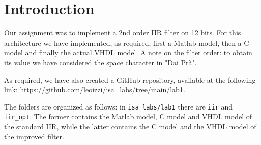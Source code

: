 \chapter{Introduction}

Our assignment was to implement a 2nd order IIR filter on 12 bits. For this architecture we have implemented, as required,
first a Matlab model, then a C model and finally the actual VHDL model.
A note on the filter order: to obtain its value we have considered the space character in "Dai Pr\`a".

As required, we have also created a GitHub repository, available at the following link: \url{https://github.com/leoizzi/isa_labs/tree/main/lab1}.

The folders are organized as follows: in \verb|isa_labs/lab1| there are \verb|iir| and \verb|iir_opt|. The former contains the Matlab model, C model
and VHDL model of the standard IIR, while the latter contains the C model and the VHDL model of the improved filter.